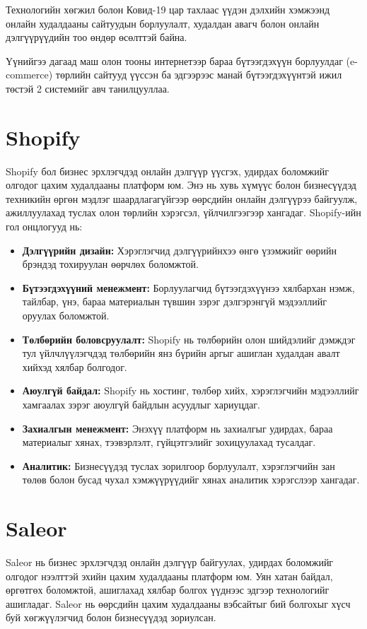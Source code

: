 Технологийн хөгжил болон Ковид-19 цар тахлаас үүдэн дэлхийн хэмжээнд онлайн худалдааны сайтуудын борлуулалт, худалдан авагч болон онлайн дэлгүүрүүдийн тоо өндөр өсөлттэй байна.

Үүнийгээ дагаад маш олон тооны интернетээр бараа бүтээгдэхүүн борлуулдаг (e-commerce) төрлийн сайтууд үүссэн ба эдгээрээс манай бүтээгдэхүүнтэй ижил төстэй 2 системийг авч танилцууллаа.

\section{Shopify}
Shopify бол бизнес эрхлэгчдэд онлайн дэлгүүр үүсгэх, удирдах боломжийг олгодог цахим худалдааны платформ юм. Энэ нь хувь хүмүүс болон бизнесүүдэд техникийн өргөн мэдлэг шаардлагагүйгээр өөрсдийн онлайн дэлгүүрээ байгуулж, ажиллуулахад туслах олон төрлийн хэрэгсэл, үйлчилгээгээр хангадаг. Shopify-ийн гол онцлогууд нь:
\begin{itemize}
   \item \textbf{Дэлгүүрийн дизайн:} Хэрэглэгчид дэлгүүрийнхээ өнгө үзэмжийг өөрийн брэндэд тохируулан өөрчлөх боломжтой.

   \item  \textbf{Бүтээгдэхүүний менежмент:} Борлуулагчид бүтээгдэхүүнээ хялбархан нэмж, тайлбар, үнэ, бараа материалын түвшин зэрэг дэлгэрэнгүй мэдээллийг оруулах боломжтой.

   \item  \textbf{Төлбөрийн боловсруулалт:} Shopify нь төлбөрийн олон шийдэлийг дэмждэг тул үйлчлүүлэгчдэд төлбөрийн янз бүрийн аргыг ашиглан худалдан авалт хийхэд хялбар болгодог.

   \item  \textbf{Аюулгүй байдал:} Shopify нь хостинг, төлбөр хийх, хэрэглэгчийн мэдээллийг хамгаалах зэрэг аюулгүй байдлын асуудлыг хариуцдаг.

   \item \textbf{Захиалгын менежмент:} Энэхүү платформ нь захиалгыг удирдах, бараа материалыг хянах, тээвэрлэлт, гүйцэтгэлийг зохицуулахад тусалдаг.

   \item \textbf{Аналитик:} Бизнесүүдэд туслах зорилгоор борлуулалт, хэрэглэгчийн зан төлөв болон бусад чухал хэмжүүрүүдийг хянах аналитик хэрэгслээр хангадаг.
\end{itemize}


\section{Saleor}
Saleor нь бизнес эрхлэгчдэд онлайн дэлгүүр байгуулах, удирдах боломжийг олгодог нээлттэй эхийн цахим худалдааны платформ юм. Уян хатан байдал, өргөтгөх боломжтой, ашиглахад хялбар болгох үүднээс эдгээр технологийг ашигладаг. Saleor нь өөрсдийн цахим худалдааны вэбсайтыг бий болгохыг хүсч буй хөгжүүлэгчид болон бизнесүүдэд зориулсан.


